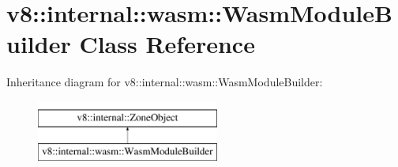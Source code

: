 \hypertarget{classv8_1_1internal_1_1wasm_1_1WasmModuleBuilder}{}\section{v8\+:\+:internal\+:\+:wasm\+:\+:Wasm\+Module\+Builder Class Reference}
\label{classv8_1_1internal_1_1wasm_1_1WasmModuleBuilder}
Inheritance diagram for v8\+:\+:internal\+:\+:wasm\+:\+:Wasm\+Module\+Builder\+:\begin{figure}[H]
\begin{center}
\leavevmode
\includegraphics[height=2.000000cm]{classv8_1_1internal_1_1wasm_1_1WasmModuleBuilder}
\end{center}
\end{figure}
